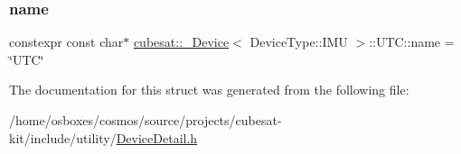 \subsubsection{\texorpdfstring{name}{name}}
{\footnotesize\ttfamily constexpr const char$\ast$ \hyperlink{structcubesat_1_1__Device}{cubesat\+::\+\_\+\+Device}$<$ Device\+Type\+::\+I\+MU $>$\+::U\+T\+C\+::name = \char`\"{}U\+TC\char`\"{}\hspace{0.3cm}{\ttfamily [static]}}



The documentation for this struct was generated from the following file\+:\begin{DoxyCompactItemize}
\item 
/home/osboxes/cosmos/source/projects/cubesat-\/kit/include/utility/\hyperlink{DeviceDetail_8h}{Device\+Detail.\+h}\end{DoxyCompactItemize}

